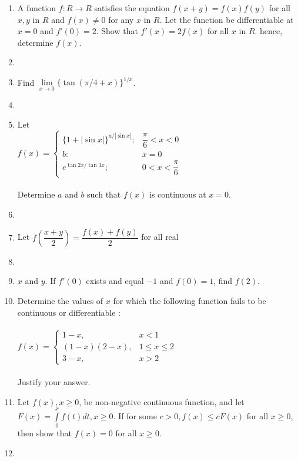 \begin{enumerate}[label=\arabic*.,ref=\thesubsection.\theenumi]
\item A function $f:R \to R$ satisfies the equation $f(x+y)=f(x)f(y)$ for all $x,y$ in $R$ and $f(x)\neq 0$ for any $x$ in $R$. Let the function be differentiable at $x=0$ and $f'(0)=2$. Show that $f'(x)=2f(x)$ for all $x$ in $R$. hence, determine $f(x)$. \item[~]

\item Find $\lim\limits_{x \to 0}\{\tan(\pi/4+x)\}^{1/x}$. \item[~]

\item Let \\$f(x)=\begin{cases}
\{1+|\sin x|\}^{a/|\sin x|}; &\text{$\dfrac{\pi}{6}<x<0$}\\
b: &\text{$x=0$}\\
e^{\tan 2x/\tan 3x}; &\text{$0<x<\dfrac{\pi}{6}$}
\end{cases}$\\ \\Determine $a$ and $b$ such that $f(x)$ is continuous at $x=0$.\item[~]

\item Let $f\left(\dfrac{x+y}{2}\right)=\dfrac{f(x)+f(y)}{2}$ for all real \item[~] \item[~]$x$ and $y$. If $f'(0)$ exists and equal $-1$ and $f(0)=1$, find $f(2)$.\\
 
\item Determine the values of $x$ for which the following function fails to be continuous or differentiable : \\ \\
$f(x)=\begin{cases}
1-x, &\text{$x<1$}\\
(1-x)(2-x), &\text{$1\leq x\leq 2$}\\
3-x, &\text{$x>2$}
\end{cases}$ \\ \\Justify your answer.\\

\item Let $f(x),x\geq 0$, be non-negative continuous function, and let $F(x)=\int\limits_0^xf(t)dt, x\geq 0$. If for some $c>0, f(x)\leq cF(x)$ for all $x\geq 0$, then show that $f(x)=0$ for all $x\geq 0$. \item[~]


\end{enumerate}
